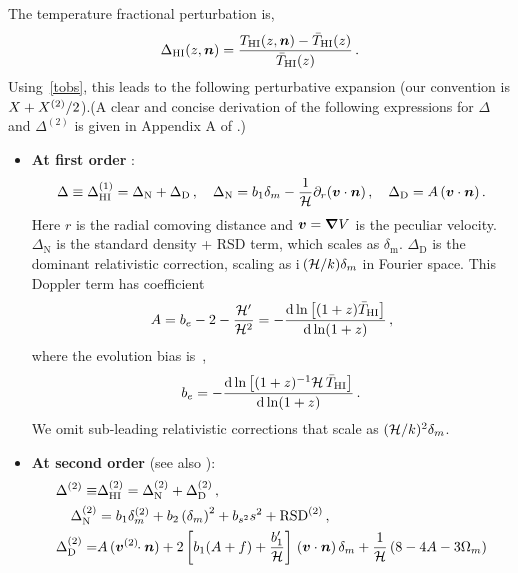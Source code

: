 The temperature fractional perturbation is,
\begin{equation}
\Delta_{{\mathrm{HI}}}(z,\bm {n}) = \frac{T_{{\mathrm{HI}}}(z,\bm {n}) - \bar{T}_{{\mathrm{HI}}} (z)}{\bar{T}_{{\mathrm{HI}}} (z)}\,.\label{e1.1_02}
\end{equation}
Using~\eqref{tobs}, this leads to the following perturbative expansion (our convention is $X+X^{{(2)}}/2$).(A clear and concise derivation of the following expressions for $\Delta$ and $\Delta^{(2)}$ is given in Appendix A of \cite{DiDio:2018zmk}.)
\begin{itemize}
\item 
{\bfseries At first order} \cite{Hall:2012wd}:
\begin{equation} \label{dt1}
\Delta \equiv \Delta^{(1)}_{{\mathrm{HI}}} = \Delta_\mathrm{N} + \Delta_\mathrm{D}\,,\quad  \Delta_\mathrm{N} = b_1\delta_m - \frac{1}{\mathcal{H}} \partial_r(\bm{v}\cdot\bm {n} )\,,\quad \Delta_\mathrm{D}=A\,(\bm{v}\cdot\bm {n} ) \,.
\end{equation}
Here $r$ is the radial comoving distance and $\bm{v}=\bm{\nabla}V$ is the peculiar velocity.
$ \Delta_\mathrm{N}$ is the standard density + RSD term, which scales as $\delta_\mathrm{m}$. $\Delta_\mathrm{D}$ is the dominant relativistic correction, scaling as i\,$(\mathcal{H}/k)\delta_m$ in Fourier space. This Doppler term has coefficient
\begin{equation}
A = b_e - 2 - \frac{\mathcal{H}'}{\mathcal{H}^{2}}= -\frac{\mathrm{d} \ln \left[(1+z) \bar{T}_{{\mathrm{HI}}} \right]}{\mathrm{d} \ln (1+z)} \,,
 \label{eq:AcoeffTrel}
\end{equation}
where the evolution bias is~\cite{Fonseca:2015laa},
\begin{equation}
b_e = -\frac{\mathrm{d} \ln \left[(1+z)^{-1}\mathcal{H}\, \bar{T}_{{\mathrm{HI}}} \right]}{\mathrm{d} \ln (1+z)}\,.
\end{equation}
We omit sub-leading relativistic corrections that scale as $(\mathcal{H}/k)^2\delta_m$. 
%
%
\item
{\bfseries At second order}
\cite{Maartens:2019yhx} (see also \cite{Umeh:2015gza,DiDio:2015bua,Umeh:2016thy,Clarkson:2018dwn,DiDio:2018zmk}):
\begin{align}
\Delta^{\tw} \equiv& \Delta^{(2)}_{\hi} = \Delta^{\tw}_\mathrm{N} + \Delta^{\tw}_\mathrm{D} \,,\\
\Delta^{\tw}_\mathrm{N}&= b_1\delta_m^{\tw}+b_2 \left(\delta_m \right)^2+ b_{s^2}s^2 + \mathrm{RSD}^{\tw}\,,
\label{d2n} \\
\Delta^{\tw}_\mathrm{D} =& A\, (\v^{(2)}\!\!\cdot\n)+2\left[ b_{1} (A+f) + \frac{b_1'}{\cH}\right]\,(\v\cdot\n)\,\delta_m +\frac{1}{\cH}\left( 8 - 4 A-3 \Omega_m \right) \nonumber \\

\end{align}
\end{itemize}
